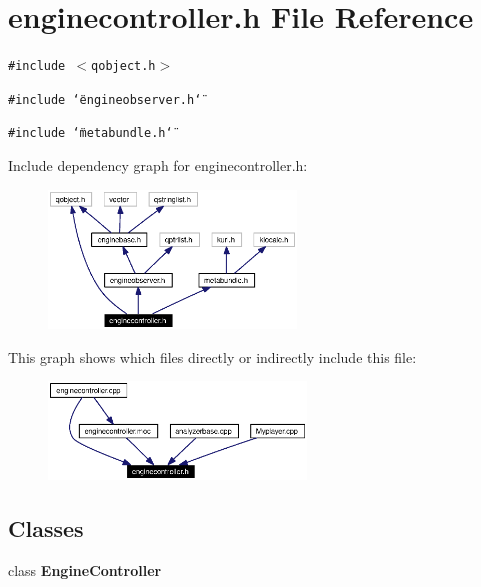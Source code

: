 \section{enginecontroller.h File Reference}
\label{enginecontroller_8h}


{\tt \#include $<$qobject.h$>$}\par
{\tt \#include \char`\"{}engineobserver.h\char`\"{}}\par
{\tt \#include \char`\"{}metabundle.h\char`\"{}}\par


Include dependency graph for enginecontroller.h:\begin{figure}[H]
\begin{center}
\leavevmode
\includegraphics[width=187pt]{enginecontroller_8h__incl}
\end{center}
\end{figure}


This graph shows which files directly or indirectly include this file:\begin{figure}[H]
\begin{center}
\leavevmode
\includegraphics[width=194pt]{enginecontroller_8h__dep__incl}
\end{center}
\end{figure}
\subsection*{Classes}
\begin{CompactItemize}
\item 
class {\bf Engine\-Controller}
\end{CompactItemize}
